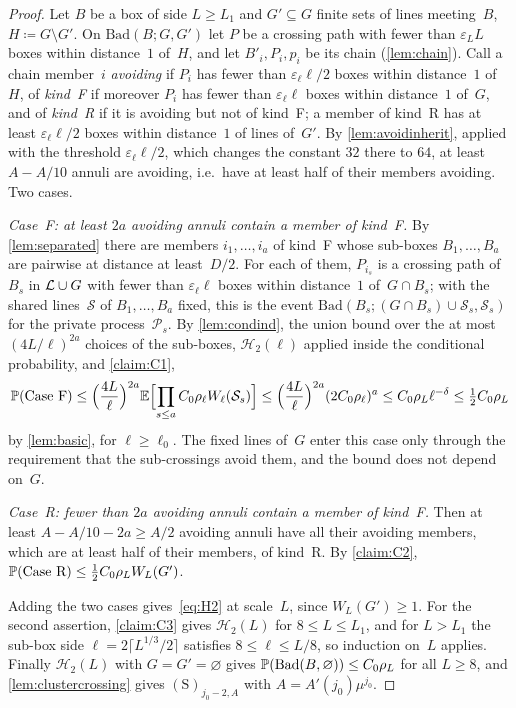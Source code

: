 \documentclass[11pt,letterpaper]{article}
\newcommand{\Bad}{\mathrm{Bad}}
\begin{document}
\begin{proof}
Let $B$ be a box of side $L\ge L_1$ and $G'\subseteq G$ finite sets of lines meeting~$B$, $H\coloneqq G\setminus G'$. On $\Bad(B;G,G')$ let $P$ be a crossing path with fewer than $\varepsilon_LL$ boxes within distance~$1$ of~$H$, and let $B'_i,P_i,p_i$ be its chain (\cref{lem:chain}). Call a chain member~$i$ \emph{avoiding} if $P_i$ has fewer than $\varepsilon_\ell\ell/2$ boxes within distance~$1$ of~$H$, of \emph{kind~F} if moreover $P_i$ has fewer than $\varepsilon_\ell\ell$ boxes within distance~$1$ of~$G$, and of \emph{kind~R} if it is avoiding but not of kind~F; a member of kind~R has at least $\varepsilon_\ell\ell/2$ boxes within distance~$1$ of lines of~$G'$. By \cref{lem:avoidinherit}, applied with the threshold $\varepsilon_\ell\ell/2$, which changes the constant $32$ there to $64$, at least $A-A/10$ annuli are avoiding, i.e.\ have at least half of their members avoiding. Two cases.

\emph{Case~F: at least $2a$ avoiding annuli contain a member of kind~F.} By \cref{lem:separated} there are members $i_1,\dots,i_a$ of kind~F whose sub-boxes $B_1,\dots,B_a$ are pairwise at distance at least~$D/2$. For each of them, $P_{i_s}$ is a crossing path of~$B_s$ in $\cL\cup G$ with fewer than $\varepsilon_\ell\ell$ boxes within distance~$1$ of~$G\cap B_s$; with the shared lines~$\mathcal S$ of $B_1,\dots,B_a$ fixed, this is the event $\Bad(B_s;(G\cap B_s)\cup\mathcal S_s,\mathcal S_s)$ for the private process~$\mathcal P_s$. By \cref{lem:condind}, the union bound over the at most $(4L/\ell)^{2a}$ choices of the sub-boxes, $\mathcal H_2(\ell)$ applied inside the conditional probability, and \cref{claim:C1},
\begin{equation*}
  \P(\text{Case~F})\le\Bigl(\frac{4L}{\ell}\Bigr)^{2a}\E\Bigl[\prod_{s\le a}C_0\rho_\ell W_\ell(\mathcal S_s)\Bigr]\le\Bigl(\frac{4L}{\ell}\Bigr)^{2a}(2C_0\rho_\ell)^a\le C_0\rho_L\ell^{-\delta}\le\tfrac12C_0\rho_L
\end{equation*}
by \cref{lem:basic}, for $\ell\ge\ell_0$. The fixed lines of~$G$ enter this case only through the requirement that the sub-crossings avoid them, and the bound does not depend on~$G$.

\emph{Case~R: fewer than $2a$ avoiding annuli contain a member of kind~F.} Then at least $A-A/10-2a\ge A/2$ avoiding annuli have all their avoiding members, which are at least half of their members, of kind~R. By \cref{claim:C2}, $\P(\text{Case~R})\le\tfrac12C_0\rho_LW_L(G')$.

Adding the two cases gives~\eqref{eq:H2} at scale~$L$, since $W_L(G')\ge1$. For the second assertion, \cref{claim:C3} gives $\mathcal H_2(L)$ for $8\le L\le L_1$, and for $L>L_1$ the sub-box side $\ell=2\lceil L^{1/3}/2\rceil$ satisfies $8\le\ell\le L/8$, so induction on~$L$ applies. Finally $\mathcal H_2(L)$ with $G=G'=\varnothing$ gives $\P(\Bad(B,\varnothing))\le C_0\rho_L$ for all $L\ge8$, and \cref{lem:clustercrossing} gives $\mathrm{(S)}_{j_0-2,A}$ with $A=A'(j_0)\mu^{j_0}$.
\end{proof}
\end{document}

